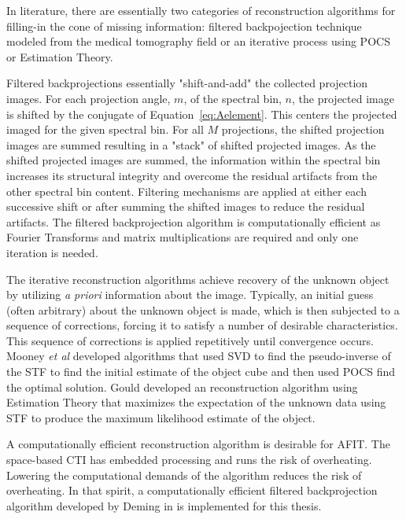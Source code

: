 In literature, there are essentially two categories of reconstruction algorithms for filling-in the cone of missing information: filtered backpojection technique modeled from the medical tomography field\cite{Bernhardt} or an iterative process using \ac{POCS} or Estimation Theory. 

Filtered backprojections essentially "shift-and-add" the collected projection images. For each projection angle, $m$, of the spectral bin, $n$, the projected image is shifted by the conjugate of Equation~\eqref{eq:Aelement}. This centers the projected imaged for the given spectral bin. For all $M$ projections, the shifted projection images are summed resulting in a "stack" of shifted projected images. As the shifted projected images are summed, the information within the spectral bin increases its structural integrity and overcome the residual artifacts from the other spectral bin content. Filtering mechanisms are applied at either each successive shift or after summing the shifted images to reduce the residual artifacts. The filtered backprojection algorithm is computationally efficient as Fourier Transforms and matrix multiplications are required and only one iteration is needed.


The iterative reconstruction algorithms achieve recovery of the unknown object by utilizing \emph{a priori} information about the image. Typically, an initial guess (often arbitrary) about the unknown object is made, which is then subjected to a sequence of corrections, forcing it to satisfy a number of desirable characteristics. This sequence of corrections is applied repetitively until convergence occurs. Mooney \emph{et al} developed algorithms\cite{SVDPOCS98,SVDPOCS99} that used \ac{SVD} to find the pseudo-inverse of the STF to find the initial estimate of the object cube and then used POCS find the optimal solution. Gould developed an reconstruction algorithm using Estimation Theory that maximizes the expectation of the unknown data using STF to produce the maximum likelihood estimate of the object\cite{Gould}.

A computationally efficient reconstruction algorithm is desirable for AFIT. The space-based CTI has embedded processing and runs the risk of overheating\cite{DK}. Lowering the computational demands of the algorithm reduces the risk of overheating. In that spirit, a computationally efficient filtered backprojection algorithm developed by Deming in \cite{Deming} is implemented for this thesis.

